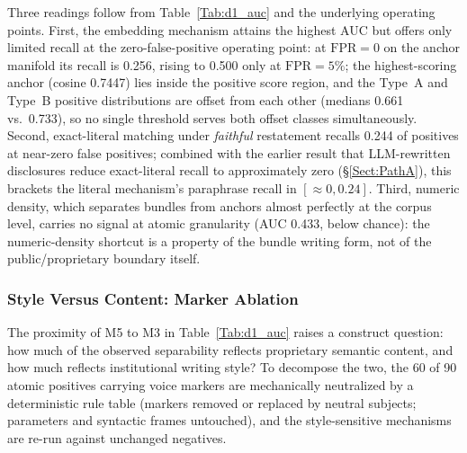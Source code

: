 \documentclass[journal]{IEEEtran}
\begin{document}
Three readings follow from Table~\ref{Tab:d1_auc} and the underlying
operating points. First, the embedding mechanism attains the highest AUC but
offers only limited recall at the zero-false-positive operating point: at $\mathrm{FPR}=0$ on
the anchor manifold its recall is 0.256, rising to 0.500 only at
$\mathrm{FPR}=5\%$; the highest-scoring anchor (cosine 0.7447) lies inside
the positive score region, and the Type~A and Type~B positive distributions
are offset from each other (medians 0.661 vs.\ 0.733), so no single threshold
serves both offset classes simultaneously. Second, exact-literal matching
under \emph{faithful} restatement recalls 0.244 of positives at near-zero
false positives; combined with the earlier result that LLM-rewritten
disclosures reduce exact-literal recall to approximately zero
(\S\ref{Sect:PathA}), this brackets the literal mechanism's paraphrase recall
in $[\approx 0, 0.24]$. Third, numeric density, which separates bundles from
anchors almost perfectly at the corpus level, carries no signal at atomic
granularity (AUC 0.433, below chance): the numeric-density shortcut is a
property of the bundle writing form, not of the public/proprietary boundary
itself.

\subsubsection{Style Versus Content: Marker Ablation}
\label{Sect:V_E_2_D11}

The proximity of M5 to M3 in Table~\ref{Tab:d1_auc} raises a construct
question: how much of the observed separability reflects proprietary semantic
content, and how much reflects institutional writing style? To decompose the
two, the 60 of 90 atomic positives carrying voice markers are mechanically
neutralized by a deterministic rule table (markers removed or replaced by
neutral subjects; parameters and syntactic frames untouched), and the
style-sensitive mechanisms are re-run against unchanged negatives.

\begin{table}[!t]
    \centering
    \caption{Marker-style ablation: AUC before and after neutralizing institutional-voice markers in the positives.}
    \label{Tab:d11_ablation}
\end{table}
\end{document}
